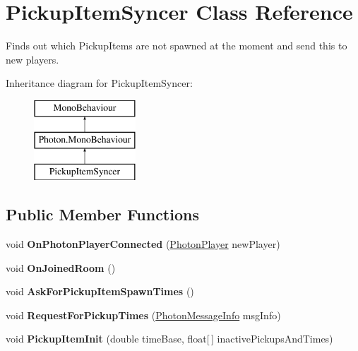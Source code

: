\hypertarget{class_pickup_item_syncer}{}\section{Pickup\+Item\+Syncer Class Reference}
\label{class_pickup_item_syncer}


Finds out which Pickup\+Items are not spawned at the moment and send this to new players.  


Inheritance diagram for Pickup\+Item\+Syncer\+:\begin{figure}[H]
\begin{center}
\leavevmode
\includegraphics[height=3.000000cm]{class_pickup_item_syncer}
\end{center}
\end{figure}
\subsection*{Public Member Functions}
\begin{DoxyCompactItemize}
\item 
void {\bfseries On\+Photon\+Player\+Connected} (\hyperlink{class_photon_player}{Photon\+Player} new\+Player)\hypertarget{class_pickup_item_syncer_a03bd1854f3cd463eeb6069d8361f9291}{}\label{class_pickup_item_syncer_a03bd1854f3cd463eeb6069d8361f9291}

\item 
void {\bfseries On\+Joined\+Room} ()\hypertarget{class_pickup_item_syncer_a3d32b13c4ab1ce5ae07bcd53cba4e27e}{}\label{class_pickup_item_syncer_a3d32b13c4ab1ce5ae07bcd53cba4e27e}

\item 
void {\bfseries Ask\+For\+Pickup\+Item\+Spawn\+Times} ()\hypertarget{class_pickup_item_syncer_aa547e02e224afe732975461f6e9b199e}{}\label{class_pickup_item_syncer_aa547e02e224afe732975461f6e9b199e}

\item 
void {\bfseries Request\+For\+Pickup\+Times} (\hyperlink{class_photon_message_info}{Photon\+Message\+Info} msg\+Info)\hypertarget{class_pickup_item_syncer_a8e9a45de2ffa43ff060ac3f7090e9c89}{}\label{class_pickup_item_syncer_a8e9a45de2ffa43ff060ac3f7090e9c89}

\item 
void {\bfseries Pickup\+Item\+Init} (double time\+Base, float\mbox{[}$\,$\mbox{]} inactive\+Pickups\+And\+Times)\hypertarget{class_pickup_item_syncer_a4de4ad14f8762a6f4a18206cb043376f}{}\label{class_pickup_item_syncer_a4de4ad14f8762a6f4a18206cb043376f}

\end{DoxyCompactItemize}
